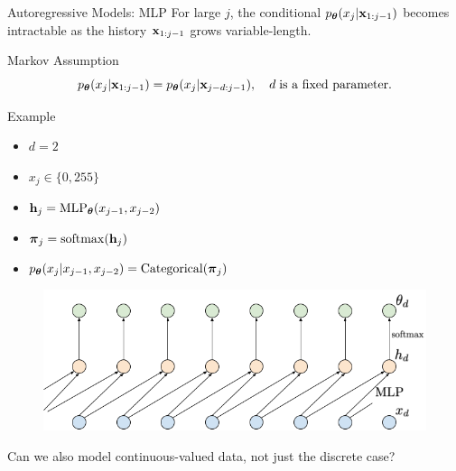 \documentclass{beamer}
\begin{document}
\begin{frame}{Autoregressive Models: MLP}
	For large $j$, the conditional $p_{\boldsymbol{\theta}}(x_j | \mathbf{x}_{1:j - 1})$ becomes intractable as the history $\mathbf{x}_{1:j-1}$ grows variable-length.
    \eqpause
	\begin{block}{Markov Assumption}
		\vspace{-0.3cm}
		$$
			p_{\boldsymbol{\theta}}(x_j | \mathbf{x}_{1:j - 1}) = p_{\boldsymbol{\theta}}(x_j | \mathbf{x}_{j - d:j - 1}),\quad d\;\text{is a fixed parameter}.
		$$
	\end{block}
    \eqpause
	\vspace{-0.5cm}
	\begin{block}{Example}
		\begin{minipage}[t]{0.39\columnwidth}
			{\small
			\begin{itemize}
				\item $d = 2$
				\item $x_j \in \{0, 255\}$
				\item $\mathbf{h}_j = \mathrm{MLP}_{\boldsymbol{\theta}}(x_{j - 1}, x_{j - 2})$
				\item $\boldsymbol{\pi}_j = \mathrm{softmax}(\mathbf{h}_j)$
				\item $p_{\boldsymbol{\theta}}(x_j | x_{j - 1}, x_{j - 2}) = \mathrm{Categorical}(\boldsymbol{\pi}_j)$
			\end{itemize}
			}
		\end{minipage}%
		\begin{minipage}[t]{0.61\columnwidth}
			 \begin{figure}
			   \centering
			   \includegraphics[width=1.0\linewidth]{figs/sequential_MLP}
			 \end{figure}
			 \eqpause
			 Can we also model continuous-valued data, not just the discrete case?
		\end{minipage}
	\end{block}
\end{frame}
\end{document}
